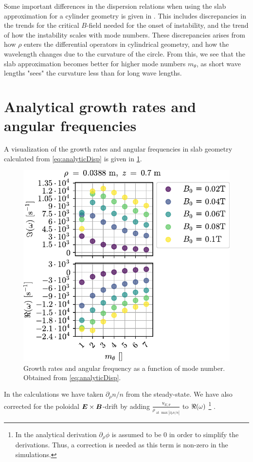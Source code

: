 %
Some important differences in the dispersion relations when using the slab approximation for a cylinder geometry is given in \cite{Ellis1980}.
This includes discrepancies in the trends for the critical $B$-field needed for the onset of instability, and the trend of how the instability scales with mode numbers.
These discrepancies arises from how $\rho$ enters the differential operators in cylindrical geometry, and how the wavelength changes due to the curvature of the circle.
From this, we see that the slab approximation becomes better for higher mode numbers $m_\theta$, as short wave lengths "sees" the curvature less than for long wave lengths.

\section{Analytical growth rates and angular frequencies}
\label{sec:analDisp}
%
A visualization of the growth rates and angular frequencies in slab geometry calculated from \cref{eq:analyticDisp} is given in \cref{fig:grAnalytic}.
%
\begin{figure}[htb]
    \centering
    \includegraphics{fig/results/growthRates/growthRatesAnalyticB0}
    \caption{Growth rates and angular frequency as a function of mode number.
        Obtained from \cref{eq:analyticDisp}.}
    \label{fig:grAnalytic}
\end{figure}
%
In the calculations we have taken $\partial_\rho n/n$ from the steady-state.
We have also corrected for the poloidal $\boldsymbol{E}\times\boldsymbol{B}$-drift by adding $\frac{u_{E,\theta}}{\rho_{\text{ at }\max|\partial_\rho n/n|}}$ to $\Re(\omega)$%
\footnote{
    In the analytical derivation $\partial_\rho \phi$ is assumed to be $0$ in order to simplify the derivations.
    Thus, a correction is needed as this term is non-zero in the simulations.
}
%
.

